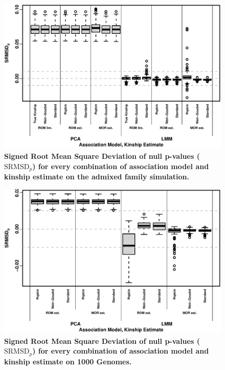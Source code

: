 \documentclass[11pt]{article}
\newcommand{\rmsd}{\text{SRMSD}_p}
\begin{document}
\begin{figure}[hp!]
  \centering
  \includegraphics[width=\textwidth]{sim-admix-n1000-m100000-k3-f0.3-s0.5-mc100-h0.8-g20-fes/rmsd.pdf}
  \caption{
    {\bf Signed Root Mean Square Deviation of null p-values ($\rmsd$) for every combination of association model and kinship estimate on the admixed family simulation.}
    }
  \label{fig:rmsd_sim}
\end{figure}

\begin{figure}[hp!]
  \centering
  \includegraphics[width=\textwidth]{tgp-nygc-autosomes_ld_prune_1000kb_0.3_maf-0.01/rmsd.pdf}
  \caption{
    {\bf Signed Root Mean Square Deviation of null p-values ($\rmsd$) for every combination of association model and kinship estimate on 1000 Genomes.}
  }
  \label{fig:rmsd_real}
\end{figure}
\end{document}
